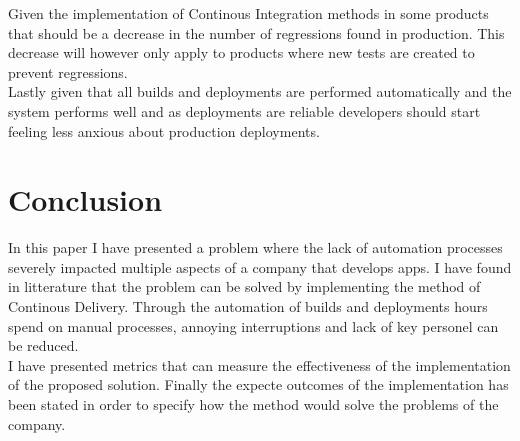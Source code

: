 \documentclass{ituthesis}
\begin{document}
Given the implementation of Continous Integration methods in some products that should be a decrease in the number of regressions found in production. This decrease will however only apply to products where new tests are created to prevent regressions.\\

Lastly given that all builds and deployments are performed automatically and the system performs well and as deployments are reliable developers should start feeling less anxious about production deployments.

\chapter{Conclusion}
\label{ch:conclusion}

In this paper I have presented a problem where the lack of automation processes severely impacted multiple aspects of a company that develops apps. I have found in litterature that the problem can be solved by implementing the method of Continous Delivery. Through the automation of builds and deployments hours spend on manual processes, annoying interruptions and lack of key personel can be reduced.\\

I have presented metrics that can measure the effectiveness of the implementation of the proposed solution. Finally the expecte outcomes of the implementation has been stated in order to specify how the method would solve the problems of the company.

\clearpage

\nocite{Humble2010}
\nocite{Bellomo2014}
\nocite{beck2001agile}

\end{document}
